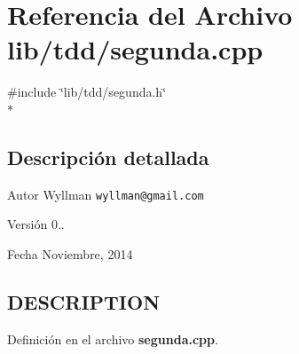 \section{Referencia del Archivo lib/tdd/segunda.cpp}
\label{segunda_8cpp}
{\ttfamily \#include \char`\"{}lib/tdd/segunda.\+h\char`\"{}}\\*


\subsection{Descripción detallada}
\begin{DoxyAuthor}{Autor}
Wyllman {\tt wyllman@gmail.\+com} 
\end{DoxyAuthor}
\begin{DoxyVersion}{Versión}
0.. 
\end{DoxyVersion}
\begin{DoxyDate}{Fecha}
Noviembre, 2014 
\end{DoxyDate}
\subsection{D\+E\+S\+C\+R\+I\+P\+T\+I\+O\+N}\label{main_8cpp_DESCRIPTION}


Definición en el archivo {\bf segunda.\+cpp}.

